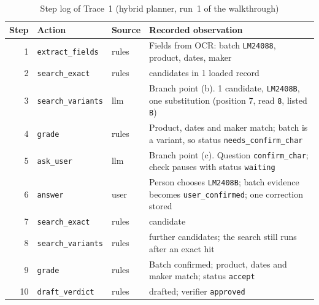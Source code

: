 \begin{table}[H]
\centering
\caption{Step log of Trace~1 (hybrid planner, run~1 of the walkthrough)}
\label{tab:app-trace1}
\small
\renewcommand{\arraystretch}{1.12}
\begin{tabularx}{\linewidth}{@{}r l l >{\raggedright\arraybackslash}X@{}}
\toprule
\textbf{Step} & \textbf{Action} & \textbf{Source} & \textbf{Recorded observation} \\
\midrule
1 & \texttt{extract\_fields} & rules & Fields from OCR: batch \texttt{LM24088}, product, dates, maker \\
2 & \texttt{search\_exact} & rules & 0 candidates in 1 loaded record \\
3 & \texttt{search\_variants} & llm & Branch point (b). 1 candidate, \texttt{LM2408B}, one substitution (position 7, read \texttt{8}, listed \texttt{B}) \\
4 & \texttt{grade} & rules & Product, dates and maker match; batch is a variant, so status \texttt{needs\_confirm\_char} \\
5 & \texttt{ask\_user} & llm & Branch point (c). Question \texttt{confirm\_char}; check pauses with status \texttt{waiting} \\
6 & \texttt{answer} & user & Person chooses \texttt{LM2408B}; batch evidence becomes \texttt{user\_confirmed}; one correction stored \\
7 & \texttt{search\_exact} & rules & 1 candidate \\
8 & \texttt{search\_variants} & rules & 0 further candidates; the search still runs after an exact hit \\
9 & \texttt{grade} & rules & Batch confirmed; product, dates and maker match; status \texttt{accept} \\
10 & \texttt{draft\_verdict} & rules & \FLAGGED{} drafted; verifier \texttt{approved} \\
\bottomrule
\end{tabularx}
\end{table}

